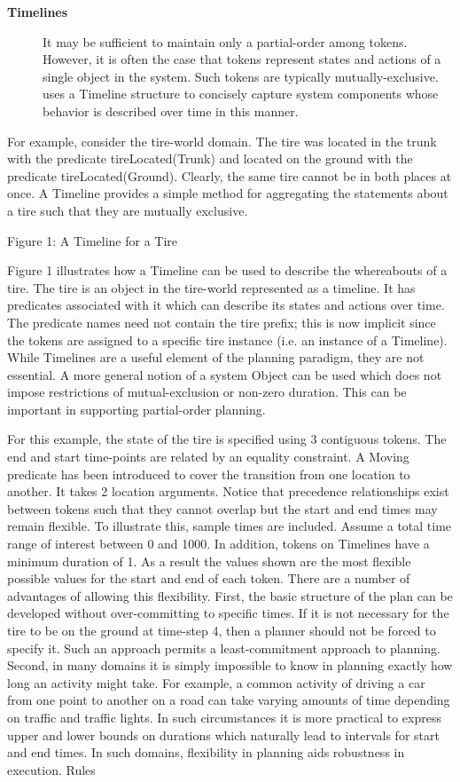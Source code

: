 \begin{description}
\item[\textbf{Timelines}] It may be sufficient to maintain only a
  partial-order among tokens. However, it is often the case that
  tokens represent states and actions of a single object in the
  system. Such tokens are typically mutually-exclusive. \eu uses a
  Timeline structure \cite{mus94} to concisely capture system
  components whose behavior is described over time in this manner.

\end{description}

For example, consider the tire-world domain. The tire was located in
the trunk with the predicate tireLocated(Trunk) and located on the
ground with the predicate tireLocated(Ground). Clearly, the same tire
cannot be in both places at once. A Timeline provides a simple method
for aggregating the statements about a tire such that they are
mutually exclusive.

Figure 1: A Timeline for a Tire

Figure 1 illustrates how a Timeline can be used to describe the
whereabouts of a tire. The tire is an object in the tire-world
represented as a timeline. It has predicates associated with it which
can describe its states and actions over time. The predicate names
need not contain the tire prefix; this is now implicit since the
tokens are assigned to a specific tire instance (i.e. an instance of a
Timeline). While Timelines are a useful element of the \eu planning
paradigm, they are not essential. A more general notion of a system
Object can be used which does not impose restrictions of
mutual-exclusion or non-zero duration. This can be important in
supporting partial-order planning.

For this example, the state of the tire is specified using 3
contiguous tokens. The end and start time-points are related by an
equality constraint. A Moving predicate has been introduced to cover
the transition from one location to another. It takes 2 location
arguments. Notice that precedence relationships exist between tokens
such that they cannot overlap but the start and end times may remain
flexible. To illustrate this, sample times are included. Assume a
total time range of interest between 0 and 1000. In addition, tokens
on Timelines have a minimum duration of 1. As a result the values
shown are the most flexible possible values for the start and end of
each token. There are a number of advantages of allowing this
flexibility. First, the basic structure of the plan can be developed
without over-committing to specific times. If it is not necessary for
the tire to be on the ground at time-step 4, then a planner should not
be forced to specify it. Such an approach permits a least-commitment
approach to planning. Second, in many domains it is simply impossible
to know in planning exactly how long an activity might take. For
example, a common activity of driving a car from one point to another
on a road can take varying amounts of time depending on traffic and
traffic lights. In such circumstances it is more practical to express
upper and lower bounds on durations which naturally lead to intervals
for start and end times. In such domains, flexibility in planning aids
robustness in execution.  Rules

